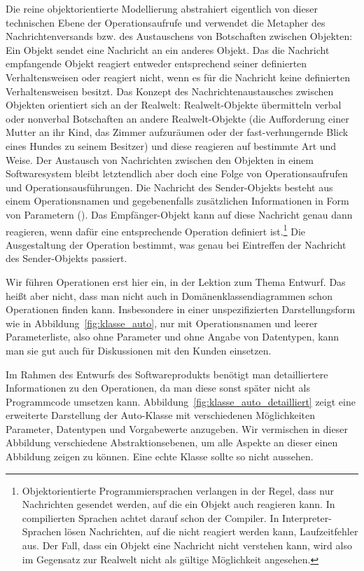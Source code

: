 Die reine objektorientierte Modellierung abstrahiert eigentlich von dieser technischen Ebene der Operationsaufrufe und verwendet die Metapher
des Nachrichtenversands bzw. des Austauschens von Botschaften zwischen Objekten: Ein Objekt sendet eine Nachricht an ein anderes Objekt. Das die Nachricht empfangende Objekt reagiert entweder entsprechend seiner definierten Verhaltensweisen oder reagiert nicht, wenn es für die Nachricht keine definierten Verhaltensweisen besitzt. Das Konzept des Nachrichtenaustausches zwischen Objekten orientiert sich an der Realwelt: Realwelt-Objekte übermitteln verbal oder nonverbal Botschaften an andere Realwelt-Objekte (\zb die Aufforderung einer Mutter an ihr Kind, das Zimmer aufzuräumen oder der fast-verhungernde Blick eines Hundes zu seinem Besitzer) und diese reagieren auf bestimmte Art und Weise. Der Austausch von Nachrichten zwischen den Objekten in einem Softwaresystem bleibt letztendlich aber doch eine Folge von Operationsaufrufen und Operationsausführungen. Die Nachricht des Sender-Objekts besteht aus einem Operationsnamen und gegebenenfalls zusätzlichen Informationen in Form von Parametern (\su). Das Empfänger-Objekt kann auf diese Nachricht genau dann reagieren, wenn dafür eine entsprechende Operation definiert ist.\footnote{Objektorientierte Programmiersprachen verlangen in der Regel, dass nur Nachrichten gesendet werden, auf die ein Objekt auch reagieren kann. In compilierten Sprachen achtet darauf schon der Compiler. In Interpreter-Sprachen lösen Nachrichten, auf die nicht reagiert werden kann, Laufzeitfehler aus. Der Fall, dass ein Objekt eine Nachricht nicht verstehen kann, wird also im Gegensatz zur Realwelt nicht als gültige Möglichkeit angesehen.} Die Ausgestaltung der Operation bestimmt, was genau bei Eintreffen der Nachricht des Sender-Objekts passiert. 

Wir führen Operationen erst hier ein, in der Lektion zum Thema Entwurf. Das heißt aber nicht, dass man nicht auch in Domänenklassendiagrammen schon Operationen finden kann. Insbesondere in einer unspezifizierten Darstellungsform wie in Abbildung~\ref{fig:klasse_auto}, nur mit Operationsnamen und leerer Parameterliste, also ohne Parameter und ohne Angabe von Datentypen, kann man sie gut auch für Diskussionen mit den Kunden einsetzen. 

Im
Rahmen des Entwurfs des Softwareprodukts benötigt man detailliertere Informa\-tionen zu den Operationen, da man diese sonst später nicht als Programmcode umsetzen kann. Abbildung~\ref{fig:klasse_auto_detailliert} zeigt eine erweiterte Darstellung der Auto-Klasse mit verschiedenen Möglichkeiten Parameter, Datentypen und Vorgabewerte anzugeben. Wir vermischen in dieser Abbildung verschiedene Abstraktionsebenen, um alle Aspekte an dieser einen Abbildung zeigen zu können. Eine echte Klasse sollte so nicht aussehen.

